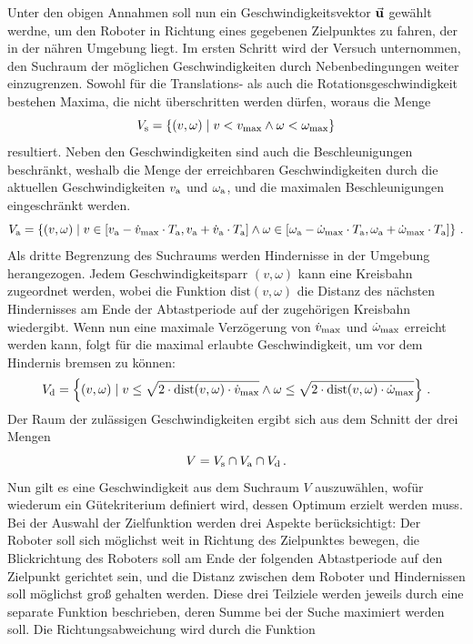 Unter den obigen Annahmen soll nun ein Geschwindigkeitsvektor $\vec{\mathbf{u}}$ gewählt werdne, um den Roboter in Richtung eines gegebenen Zielpunktes zu fahren, der in der nähren Umgebung liegt. Im ersten Schritt wird der Versuch unternommen, den Suchraum der möglichen Geschwindigkeiten durch Nebenbedingungen weiter einzugrenzen. Sowohl für die Translations- als auch die Rotationsgeschwindigkeit bestehen Maxima, die nicht überschritten werden dürfen, woraus die Menge
\begin{equation}
V_{\text{s}} = \left\{ (v,\omega) \hspace{1mm} \vert \hspace{1mm} v < v_{\text{max}} \land \omega < \omega_{\text{max}}\right\}
\end{equation}
resultiert. Neben den Geschwindigkeiten sind auch die Beschleunigungen beschränkt, weshalb die Menge der erreichbaren Geschwindigkeiten durch die aktuellen Geschwindigkeiten  $v_{\text{a}}$ und $\omega_{\text{a}}$, und die maximalen Beschleunigungen eingeschränkt werden.
\begin{equation}
V_{\text{a}} = \left\{ (v,\omega) \hspace{1mm} \vert \hspace{1mm} v \in \left[v_{\text{a}}-\dot{v}_{\text{max}}\cdot T_{\text{a}}, v_{\text{a}}+\dot{v}_{\text{a}}\cdot T_{\text{a}}\right] \land \omega \in \left[\omega_{\text{a}}-\dot{\omega}_{\text{max}}\cdot T_{\text{a}}, \omega_{\text{a}}+\dot{\omega}_{\text{max}}\cdot T_{\text{a}}\right] \right\}\,.
\end{equation}
Als dritte Begrenzung des Suchraums werden Hindernisse in der Umgebung herangezogen. Jedem Geschwindigkeitsparr $(v,\omega)$ kann eine Kreisbahn zugeordnet werden, wobei die Funktion $\text{dist}(v,\omega)$ die Distanz des nächsten Hindernisses am Ende der Abtastperiode auf der zugehörigen Kreisbahn wiedergibt. Wenn nun eine maximale Verzögerung von $\dot{v}_{\text{max}}$ und $\dot{\omega}_{\text{max}}$ erreicht werden kann, folgt für die maximal erlaubte Geschwindigkeit, um vor dem Hindernis bremsen zu können:
\begin{equation}
V_{\text{d}} = \left\{ (v,\omega) \hspace{1mm} \vert \hspace{1mm} v \leq \sqrt{2\cdot \text{dist}(v,\omega)\cdot \dot{v}_{\text{max}}} \land \omega \leq \sqrt{2\cdot\text{dist}(v,\omega)\cdot \dot{\omega}_{\text{max}}} \right\}\,.
\end{equation}
Der Raum der zulässigen Geschwindigkeiten ergibt sich aus dem Schnitt der drei Mengen
\begin{equation}
V = V_{\text{s}} \cap V_{\text{a}} \cap V_{\text{d}}\,.
\end{equation}
Nun gilt es eine Geschwindigkeit aus dem Suchraum $V$ auszuwählen, wofür wiederum ein Gütekriterium definiert wird, dessen Optimum erzielt werden muss. Bei der Auswahl der Zielfunktion werden drei Aspekte berücksichtigt: Der Roboter soll sich möglichst weit in Richtung des Zielpunktes bewegen, die Blickrichtung des Roboters soll am Ende der folgenden Abtastperiode auf den Zielpunkt gerichtet sein, und die Distanz zwischen dem Roboter und Hindernissen soll möglichst groß gehalten werden. Diese drei Teilziele werden jeweils durch eine separate Funktion beschrieben, deren Summe bei der Suche maximiert werden soll. Die Richtungsabweichung wird durch die Funktion
